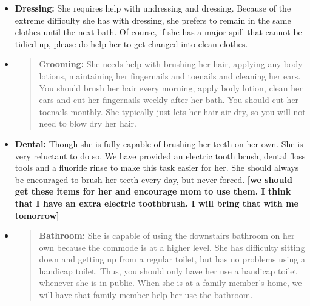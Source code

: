 \documentclass[]{article}
\begin{document}
\begin{itemize}
\item
  \textbf{Dressing:} She requires help with undressing and dressing.
  Because of the extreme difficulty she has with dressing, she prefers
  to remain in the same clothes until the next bath. Of course, if she
  has a major spill that cannot be tidied up, please do help her to get
  changed into clean clothes.
\end{itemize}

\begin{itemize}
\item
  \begin{quote}
  G\textbf{rooming:} She needs help with brushing her hair, applying any
  body lotions, maintaining her fingernails and toenails and cleaning
  her ears. You should brush her hair every morning, apply body lotion,
  clean her ears and cut her fingernails weekly after her bath. You
  should cut her toenails monthly. She typically just lets her hair air
  dry, so you will not need to blow dry her hair.
  \end{quote}
\end{itemize}

\begin{itemize}
\item
  \textbf{Dental:} Though she is fully capable of brushing her teeth on
  her own. She is very reluctant to do so. We have provided an electric
  tooth brush, dental floss tools and a fluoride rinse to make this task
  easier for her. She should always be encouraged to brush her teeth
  every day, but never forced. \textbf{{[}we should get these items for
  her and encourage mom to use them. I think that I have an extra
  electric toothbrush. I will bring that with me tomorrow{]}}
\end{itemize}

\begin{itemize}
\item
  \begin{quote}
  \textbf{Bathroom:} She is capable of using the downstairs bathroom on
  her own because the commode is at a higher level. She has difficulty
  sitting down and getting up from a regular toilet, but has no problems
  using a handicap toilet. Thus, you should only have her use a handicap
  toilet whenever she is in public. When she is at a family member's
  home, we will have that family member help her use the bathroom.
  \end{quote}
\end{itemize}
\end{document}

